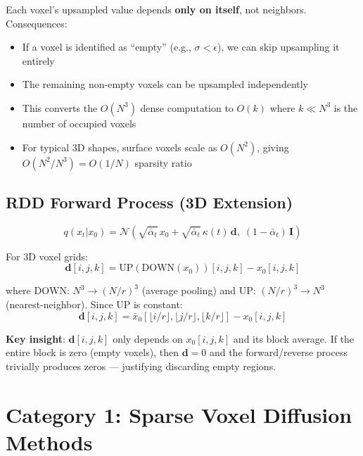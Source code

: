 \documentclass[11pt, a4paper]{article}
\newcommand{\alphabar}{\bar{\alpha}}
\begin{document}
Each voxel's upsampled value depends \textbf{only on itself}, not neighbors. Consequences:
\begin{itemize}
    \item If a voxel is identified as ``empty'' (e.g., $\sigma < \epsilon$), we can skip upsampling it entirely
    \item The remaining non-empty voxels can be upsampled independently
    \item This converts the $O(N^3)$ dense computation to $O(k)$ where $k \ll N^3$ is the number of occupied voxels
    \item For typical 3D shapes, surface voxels scale as $O(N^2)$, giving $O(N^2/N^3) = O(1/N)$ sparsity ratio
\end{itemize}

\subsection{RDD Forward Process (3D Extension)}

\begin{equation}
    q(x_t | x_0) = \mathcal{N}\!\left(\sqrt{\alphabar_t}\, x_0 + \sqrt{\alphabar_t}\, \kappa(t)\, \mathbf{d},\; (1-\alphabar_t)\,\mathbf{I}\right)
\end{equation}

For 3D voxel grids:
\begin{equation}
    \mathbf{d}[i,j,k] = \mathrm{UP}(\mathrm{DOWN}(x_0))[i,j,k] - x_0[i,j,k]
\end{equation}

where $\mathrm{DOWN}$: $N^3 \to (N/r)^3$ (average pooling) and $\mathrm{UP}$: $(N/r)^3 \to N^3$ (nearest-neighbor). Since UP is constant:
\begin{equation}
    \mathbf{d}[i,j,k] = \bar{x}_0[\lfloor i/r \rfloor, \lfloor j/r \rfloor, \lfloor k/r \rfloor] - x_0[i,j,k]
\end{equation}

\textbf{Key insight}: $\mathbf{d}[i,j,k]$ only depends on $x_0[i,j,k]$ and its block average. If the entire block is zero (empty voxels), then $\mathbf{d} = 0$ and the forward/reverse process trivially produces zeros --- justifying discarding empty regions.

\section{Category 1: Sparse Voxel Diffusion Methods}
\end{document}
